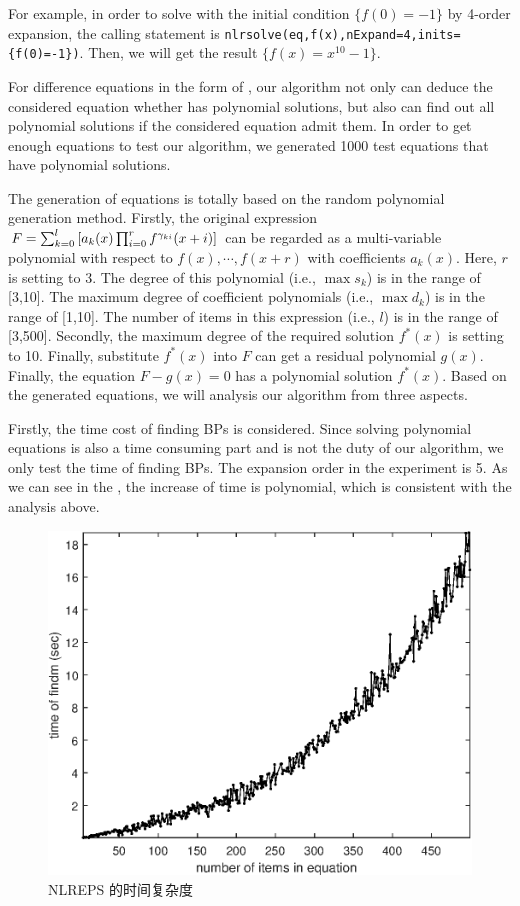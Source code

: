 For example, in order to solve  with the initial condition $\{f(0)=-1\}$ by 4-order expansion, the calling statement is \verb|nlrsolve(eq,f(x),nExpand=4,inits={f(0)=-1})|. Then, we will get the result $\{f(x)=x^{10}-1\}$.

For difference equations in the form of , our algorithm not only can deduce the considered equation whether has polynomial solutions, but also can find out all polynomial solutions if the considered equation admit them. In order to get enough equations to test our algorithm, we generated 1000 test equations that have polynomial solutions.

The generation of equations is totally based on the random polynomial generation method. Firstly, the original expression $F=\sum_{k=0}^l{\left[a_k(x)\prod_{i=0}^r{f^{\gamma_{ki}}(x+i)}\right]}$ can be regarded as a multi-variable polynomial with respect to $f(x),\cdots,f(x+r)$ with coefficients $a_k(x)$. Here, $r$ is setting to 3. The degree of this polynomial (i.e., $\max s_k$) is in the range of [3,10]. The maximum degree of coefficient polynomials (i.e., $\max d_k$) is in the range of [1,10]. The number of items in this expression (i.e., $l$) is in the range of [3,500]. Secondly, the maximum degree of the required solution $f^*(x)$ is setting to 10. Finally, substitute $f^*(x)$ into $F$ can get a residual polynomial $g(x)$. Finally, the equation $F-g(x)=0$ has a polynomial solution $f^*(x)$. Based on the generated equations, we will analysis our algorithm from three aspects.

Firstly, the time cost of finding BPs is considered. Since solving polynomial equations is also a time consuming part and is not the duty of our algorithm, we only test the time of finding BPs. The expansion order in the experiment is 5. As we can see in the , the  increase of time is polynomial, which is consistent with the analysis above.
\begin{figure}[H]
\centering
\includegraphics[width=\figwidth]{fig/nlt.eps}
\caption{NLREPS 的时间复杂度}
\label{t-findm}
\end{figure}

